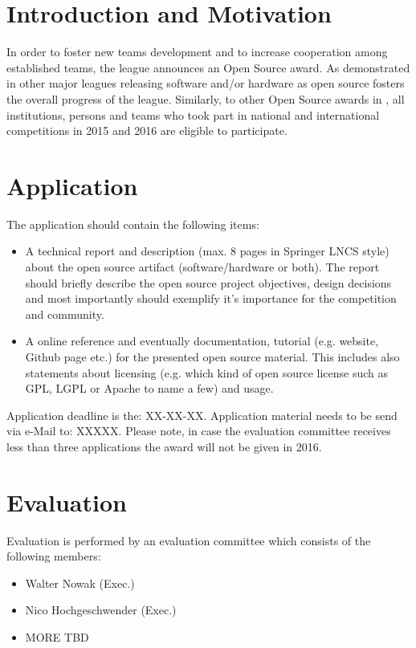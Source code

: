 \section{Introduction and Motivation}
In order to foster new teams development and to increase cooperation among established teams, the league announces an Open Source award. As demonstrated
in other \RC major leagues releasing software and/or hardware as open source fosters the overall progress of the league. Similarly, to other Open Source awards in \RC, all \RCAW institutions, persons and teams who took part in national and international \RCAW competitions in 2015 and 2016 are eligible to participate. 

\section{Application}
The application should contain the following items: 

\begin{itemize}
	\item A technical report and description (max. 8 pages in Springer LNCS style) about the open source artifact (software/hardware or both). The report should briefly describe the open source project objectives, design decisions and most importantly should exemplify it's importance for the \RCAW competition and community.   
	\item A online reference and eventually documentation, tutorial (e.g. website, Github page etc.) for the presented open source material. This includes also statements about licensing (e.g. which kind of open source license such as GPL, LGPL or Apache to name a few) and usage.  
\end{itemize}

Application deadline is the: XX-XX-XX. Application material needs to be send via e-Mail to: XXXXX. Please note, in case the evaluation committee receives less than three applications the award will not be given in 2016. 

\section{Evaluation}
Evaluation is performed by an evaluation committee which consists of the following members:

\begin{itemize}
	\item Walter Nowak (\RCAW Exec.)
	\item Nico Hochgeschwender (\RCAW Exec.)
	\item MORE TBD
\end{itemize}

